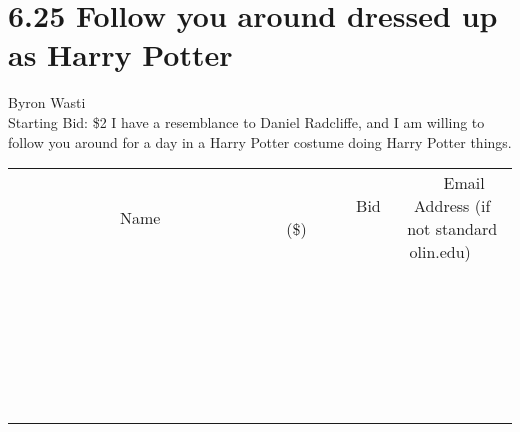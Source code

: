 \documentclass[11pt]{article}
\begin{document}
\section*{6.25 Follow you around dressed up as Harry Potter}
Byron Wasti
\\
Starting Bid: \$2
\newline
I have a resemblance to Daniel Radcliffe, and I am willing to follow you around for a day in a Harry Potter costume doing Harry Potter things.
\\[6ex]
\begin{tabular}{c c c}
~~~~~~~~~~~~~Name~~~~~~~~~~~~~ & ~~~~~~~~~Bid (\$)~~~~~~~~~  & ~~~Email Address (if not standard olin.edu)~~~\\
 & & \\
\hline
 & & \\
\hline
 & & \\
\hline
 & & \\
\hline
 & & \\
\hline
 & & \\
\hline
 & & \\
\hline
 & & \\
\hline
 & & \\
\hline
 & & \\
\hline
 & & \\
\hline
 & & \\
\hline
 & & \\
\hline
 & & \\
\hline
 & & \\
\hline
 & & \\
\hline
 & & \\
\hline
 & & \\
\hline
 & & \\
\hline
 & & \\
\hline
 & & \\
\hline
 & & \\
\hline
 & & \\
\hline
 & & \\
\hline
 & & \\
\hline
 & & \\
\hline
\end{tabular}
\newpage
\end{document}
